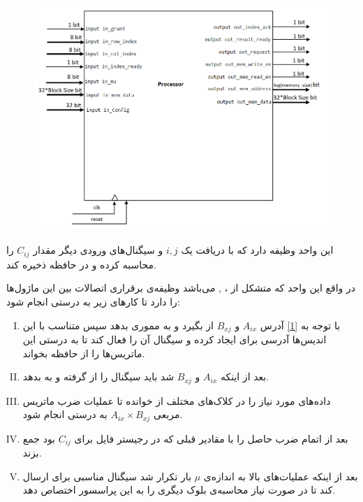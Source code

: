 \documentclass[12pt,onecolumn,a4paper,fleqn]{article}
\begin{document}
\begin{itemize}
	\begin{figure}[h]
		\centering
		\includegraphics[width=0.55\linewidth]{source/processor.png}
		\caption{}
	\end{figure}

این واحد وظیفه‌ دارد که با دریافت یک $i,j$ و سیگنال‌های ورودی دیگر مقدار $C_{ij}$ را محاسبه کرده و در حافظه ذخیره کند.

در واقع این واحد که متشکل از  ،
,
می‌باشد وظیفه‌ی برقراری اتصالات بین این ماژول‌ها را دارد تا کارهای زیر به درستی انجام شود:

\begin{enumerate}[(I)]
	\item 
	با توجه به \autoref{1}
	آدرس
	  $A_{ix}$ و $B_{xj}$
	  از 	    بگیرد و به مموری بدهد سپس متناسب با این اندیس‌ها آدرسی برای  ایجاد کرده و سیگنال  آن را فعال کند تا  به درستی این ماتریس‌ها را از حافظه بخواند.
	  
	  \item 
	  بعد از اینکه  	  $A_{ix}$ و $B_{xj}$ شد باید سیگنال  را از  گرفته و به  بدهد.
	  
	  \item 
	  داده‌های مورد نیاز  را در کلاک‌های مختلف از  خوانده تا عملیات ضرب ماتریس مربعی 	  $A_{ix}\times B_{xj}$ به درستی انجام شود.
	  
	  \item 
	  بعد از اتمام ضرب حاصل را با مقادیر قبلی که در رجیستر فایل برای $C_{ij}$ بود جمع بزند.
	  
	  \item
	 بعد از اینکه عملیات‌های بالا به اندازه‌ی $\mu$ بار تکرار شد سیگنال مناسبی برای  ارسال کند تا در صورت نیاز  محاسبه‌ی بلوک دیگری را به این پراسسور اختصاص دهد.
	   

\end{enumerate}
\end{itemize}
\end{document}
